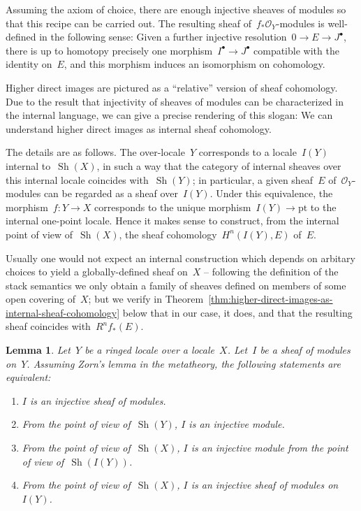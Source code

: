 \documentclass[oneside]{amsart}
\theoremstyle{definition}
\theoremstyle{plain}
\newtheorem{lemma}[defn]{Lemma}
\theoremstyle{remark}
\renewcommand{\O}{\mathcal{O}}
\DeclareMathOperator{\Sh}{Sh}
\renewcommand{\_}{\mathpunct{.}\,}
\begin{document}
Assuming the axiom of choice, there are enough injective sheaves of modules so
that this recipe can be carried out. The resulting sheaf
of~$f_*\O_Y$-modules is well-defined in the following sense: Given a further
injective resolution~$0 \to E \to J^\bullet$, there is up to homotopy precisely
one morphism~$I^\bullet \to J^\bullet$ compatible with the identity on~$E$, and
this morphism induces an isomorphism on cohomology.

Higher direct images are pictured as a ``relative'' version of sheaf
cohomology. Due to the result that injectivity of sheaves of modules can be
characterized in the internal language, we can give a precise
rendering of this slogan: We can understand higher direct images as
internal sheaf cohomology.

The details are as follows. The over-locale~$Y$ corresponds to a locale~$I(Y)$ internal to~$\Sh(X)$, in
such a way that the category of internal sheaves over this internal locale
coincides with~$\Sh(Y)$; in particular, a given sheaf~$E$ of~$\O_Y$-modules can
be regarded as a sheaf over~$I(Y)$. Under this equivalence, the morphism~$f : Y
\to X$ corresponds to the unique morphism~$I(Y) \to \mathrm{pt}$ to the
internal one-point locale. Hence it makes sense to construct, from the internal
point of view of~$\Sh(X)$, the sheaf cohomology~$H^n(I(Y), E)$ of~$E$.

Usually one would not expect an internal construction which depends on
arbitary choices to yield a globally-defined sheaf on~$X$ -- following the
definition of the stack semantics we only obtain a family of sheaves defined on
members of some open covering of~$X$; but we verify in
Theorem~\ref{thm:higher-direct-images-as-internal-sheaf-cohomology} below that in our
case, it does, and that the resulting sheaf coincides with~$R^n f_*(E)$.

\begin{lemma}\label{lemma:notions-of-internal-injectivity}
Let~$Y$ be a ringed locale over a locale~$X$. Let~$I$ be a sheaf of modules on~$Y$.
Assuming Zorn's lemma in the metatheory, the following statements are equivalent:
\begin{enumerate}
\item $I$ is an injective sheaf of modules.
\item From the point of view of~$\Sh(Y)$, $I$ is an injective module.
\item From the point of view of~$\Sh(X)$, $I$ is an injective module from the
point of view of~$\Sh(I(Y))$.
\item From the point of view of~$\Sh(X)$, $I$ is an injective sheaf of modules
on~$I(Y)$.
\end{enumerate}
\end{lemma}
\end{document}
